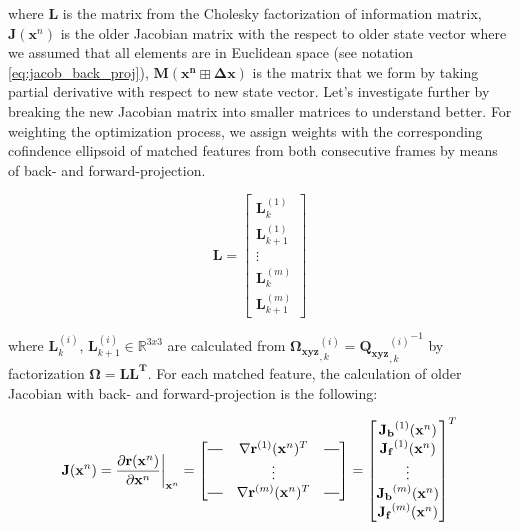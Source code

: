 \documentclass[a4paper]{report}
\numberwithin{figure}{section}
\newcommand{\R}{\mathbb{R}}
\newcommand*{\horzbar}{\rule[.5ex]{2.5ex}{0.5pt}}
\begin{document}
where $\mathbf{L}$ is the matrix from the Cholesky factorization of information matrix, 
$\mathbf{J}(\mathbf{x}^n)$ is the older Jacobian matrix with the respect to 
older state vector where we assumed that all elements are in Euclidean space 
(see notation \eqref{eq:jacob_back_proj}), 
$\mathbf{M}(\mathbf{\mathbf{x}^n \boxplus \Delta \mathbf{x}})$ is the 
matrix that we form by taking partial derivative with respect to new state vector.
Let's investigate further by breaking the new Jacobian matrix into smaller matrices 
to understand better. For weighting the optimization process, 
we assign weights with the corresponding cofindence ellipsoid of matched features 
from both consecutive frames by means of back- and forward-projection.

\begin{equation}
  \mathbf{L} 
  =
  \begin{bmatrix}
    \mathbf{L}^{(1)}_{k} \\
    \mathbf{L}^{(1)}_{k+1} \\
    \vdots \\
    \mathbf{L}^{(m)}_{k} \\
    \mathbf{L}^{(m)}_{k+1}
  \end{bmatrix}
\end{equation}

where $\mathbf{L}^{(i)}_{k} \text{, } \mathbf{L}^{(i)}_{k+1} \in \R^{3x3}$ are 
calculated from 
$\mathbf{\Omega_{xyz}}^{(i)}_{,k}  =  {\mathbf{Q_{xyz}}^{(i)}_{,k}}^{-1}$ 
by factorization $\mathbf{\Omega = LL^T}$.
For each matched feature, 
the calculation of older Jacobian with back- and forward-projection is the following:

\begin{equation}
  \mathbf{J}(\mathbf{x}^n) = \frac{\partial 
  \mathbf{r}(\mathbf{x}^n)}{\partial \mathbf{x}^n } \bigg|_{\mathbf{x}^n}
  = 
  \begin{bmatrix}
    \horzbar & \nabla \mathbf{r}^{(1)}(\mathbf{x}^n)^T & \horzbar \\
     & \vdots & \\
     \horzbar & \nabla \mathbf{r}^{(m)}(\mathbf{x}^n)^T & \horzbar 
  \end{bmatrix}
  =
  \begin{bmatrix}
    \mathbf{J_b}^{(1)}(\mathbf{x}^n) \\
    \mathbf{J_f}^{(1)}(\mathbf{x}^n) \\
    \vdots \\
    \mathbf{J_b}^{(m)}(\mathbf{x}^n) \\
    \mathbf{J_f}^{(m)}(\mathbf{x}^n)
  \end{bmatrix}^T
\end{equation}
\end{document}
